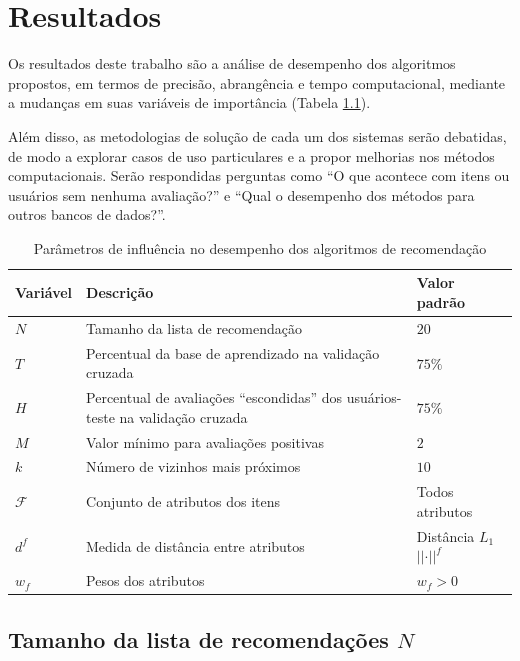 \chapter[Resultados]{Resultados}
\label{chap:resultados}

Os resultados deste trabalho são a análise de desempenho dos algoritmos propostos, em termos de precisão, abrangência e tempo computacional, mediante a mudanças em suas variáveis de importância (Tabela \ref{tab:variaveis}).

Além disso, as metodologias de solução de cada um dos sistemas serão debatidas, de modo a explorar casos de uso particulares e a propor melhorias nos métodos computacionais. Serão respondidas perguntas como ``O que acontece com itens ou usuários sem nenhuma avaliação?'' e ``Qual o desempenho dos métodos para outros bancos de dados?''.

\begin{table}[hp]
\begin{center}
    \caption{Parâmetros de influência no desempenho dos algoritmos de recomendação}
    \label{tab:variaveis}
    \begin{tabular}{  | p{2cm} | p{7cm} | p{3.5cm} | } 
    \hline
    \textbf{Variável} & \textbf{Descrição} & \textbf{Valor padrão}  \\ \hline
    $N$ & Tamanho da lista de recomendação & $20$ \\ \hline   
    $T$ & Percentual da base de aprendizado na validação cruzada & $75\%$ \\ \hline
    $H$ & Percentual de avaliações ``escondidas'' dos usuários-teste na validação cruzada & $75\%$ \\ \hline
    $M$ & Valor mínimo para avaliações positivas & $2$ \\ \hline
    $k$ & Número de vizinhos mais próximos & $10$ \\ \hline
    $\mathcal{F}$ & Conjunto de atributos dos itens & Todos atributos \\ \hline
    $d^f$ & Medida de distância entre atributos & Distância $L_1$~$\left|\left|\cdot\right|\right|^f$ \\ \hline
    $w_f$ & Pesos dos atributos & $w_f>0$ \\ \hline
    \end{tabular}
\end{center}
\end{table}

\section{Tamanho da lista de recomendações $N$} %
\label{sec:tamanho_da_lista_de_recomenda_es_}

